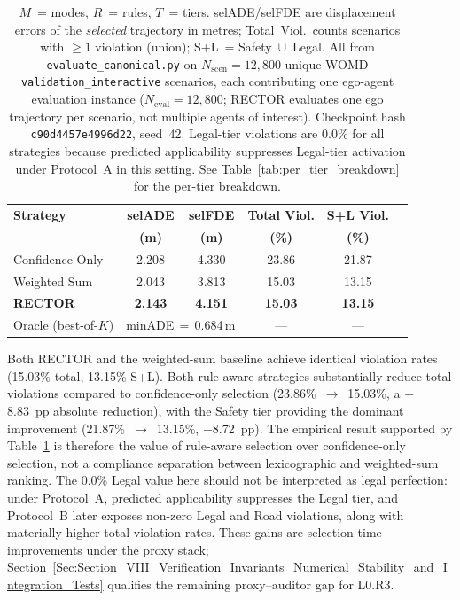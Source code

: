 \begin{table}[t]
\centering
\caption{Selection Strategy Comparison: Accuracy, Compliance, and Complexity (Protocol~A)}
\label{tab:selection_strategy}
\setlength{\tabcolsep}{3pt}
\begin{tabular}{lccccc}
\toprule
\textbf{Strategy} & \textbf{selADE} & \textbf{selFDE} & \textbf{Total Viol.} & \textbf{S+L Viol.} \\
 & \textbf{(m)} & \textbf{(m)} & \textbf{(\%)} & \textbf{(\%)}\\
\midrule
Confidence Only & 2.208 & 4.330 & 23.86 & 21.87\\
Weighted Sum & 2.043 & 3.813 & 15.03 & 13.15\\
\textbf{RECTOR} & \textbf{2.143} & \textbf{4.151} & \textbf{15.03} & \textbf{13.15}\\
\midrule
Oracle (best-of-$K$) & \multicolumn{2}{c}{minADE\,$=$\,0.684\,m} & --- & --- \\
\bottomrule
\end{tabular}
\vspace{1mm}
\caption*{\footnotesize $M$~= modes, $R$~= rules, $T$~= tiers.  selADE/selFDE are displacement errors of the \emph{selected} trajectory in metres; Total~Viol.\ counts scenarios with $\geq 1$ violation (union); S+L~= Safety~$\cup$~Legal.  All from \texttt{evaluate\_canonical.py} on $N_{\text{scen}}{=}12{,}800$ unique WOMD \texttt{validation\_interactive} scenarios, each contributing one ego-agent evaluation instance ($N_{\text{eval}}{=}12{,}800$; RECTOR evaluates one ego trajectory per scenario, not multiple agents of interest).  Checkpoint hash \texttt{c90d4457e4996d22}, seed~42.  Legal-tier violations are 0.0\% for all strategies because predicted applicability suppresses Legal-tier activation under Protocol~A in this setting.  See Table~\ref{tab:per_tier_breakdown} for the per-tier breakdown.}
\end{table}

Both RECTOR and the weighted-sum baseline achieve identical violation rates (15.03\% total, 13.15\% S+L).  Both rule-aware strategies substantially reduce total violations compared to confidence-only selection (23.86\%~$\to$~15.03\%, a $-$8.83~pp absolute reduction), with the Safety tier providing the dominant improvement (21.87\%~$\to$~13.15\%, $-$8.72~pp).  The empirical result supported by Table~\ref{tab:selection_strategy} is therefore the value of rule-aware selection over confidence-only selection, not a compliance separation between lexicographic and weighted-sum ranking.  The 0.0\% Legal value here should not be interpreted as legal perfection: under Protocol~A, predicted applicability suppresses the Legal tier, and Protocol~B later exposes non-zero Legal and Road violations, along with materially higher total violation rates.  These gains are selection-time improvements under the proxy stack; Section~\ref{Sec:Section_VIII_Verification_Invariants_Numerical_Stability_and_Integration_Tests} qualifies the remaining proxy--auditor gap for L0.R3.

